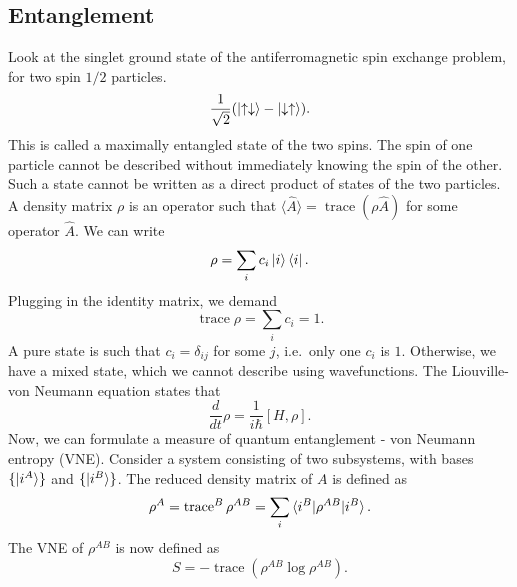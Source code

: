 \documentclass[11pt]{article}
\newcommand\ddt[1]{\frac{d #1}{d t}}
\newcommand\E[1]{\langle #1 \rangle}
\theoremstyle{definition}
\theoremstyle{remark}
\numberwithin{equation}{section}
\begin{document}
    \subsection{Entanglement}
    Look at the singlet ground state of the antiferromagnetic spin exchange problem,
    for two spin $1 / 2$ particles. \[
        \frac{1}{\sqrt{2}}(\ket{\uparrow\downarrow} - \ket{\downarrow\uparrow}).
    \] This is called a maximally entangled state of the two spins. The spin of one
    particle cannot be described without immediately knowing the spin of the other.
    Such a state cannot be written as a direct product of states of the two
    particles. \\

    A density matrix $\rho$ is an operator such that $\E{\hat{A}} =
    \operatorname{trace}(\rho\hat{A})$ for some operator $\hat{A}$. We can write \[
        \rho = \sum_{i}c_i \ket{i}\bra{i}.
    \] Plugging in the identity matrix, we demand \[
        \operatorname{trace}{\rho} = \sum_{i}c_i = 1.
    \] A pure state is such that $c_i = \delta_{ij}$ for some $j$, i.e.\ only one
    $c_i$ is $1$. Otherwise, we have a mixed state, which we cannot describe using
    wavefunctions. The Liouville-von Neumann equation states that \[
        \ddt{}\rho = \frac{1}{i\hbar}[H, \rho].
    \] Now, we can formulate a measure of quantum entanglement - von Neumann entropy
    (VNE). Consider a system consisting of two subsystems, with bases
    $\{\ket{i^A}\}$ and $\{\ket{i^B}\}$. The reduced density matrix of $A$ is
    defined as \[
        \rho^A = \operatorname{trace}^B \rho^{AB} = \sum_i \braket{i^B | \rho^{AB} |
        i^B}.
    \] The VNE of $\rho^{AB}$ is now defined as \[
        S = -\operatorname{trace}(\rho^{AB} \log{\rho^{AB}}).
    \] 
    
    
\end{document}
